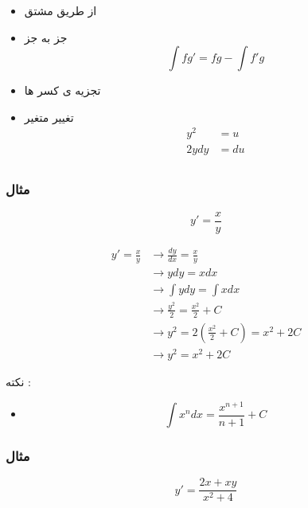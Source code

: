\documentclass[12pt]{book}
\begin{document}
\begin{tcolorbox}
\begin{itemize}
	\item از طریق مشتق
	\item جز به جز
	$$
	\int{fg'} = fg - \int{f'g}
	$$
	\item تجزیه ی کسر ها
	\item تغییر متغیر
	\begin{align*}
	y^{2} &= u \\
	2ydy &= du \\
	\end{align*}
\end{itemize}
\end{tcolorbox}

\subsubsection{مثال}

$$
y' = \frac{x}{y}
$$

\begin{align*}
y' = \frac{x}{y} &\to \frac{dy}{dx} = \frac{x}{y} \\
&\to ydy = xdx \\
&\to  \int{ydy} = \int{xdx} \\
&\to \frac{y^{2}}{2} = \frac{x^{2}}{2} + C \\
&\to y^{2} = 2 \left( \frac{x^{2}}{2} + C \right) = x^{2} + 2C \\
&\to y^{2} = x^{2} + 2C 
\end{align*}


\begin{tcolorbox}
نکته :
\begin{itemize}
	\item 
	$$
	\int {x^{n} dx} = \frac{x^{n+1}}{n+1} + C
	$$
\end{itemize}
\end{tcolorbox}


\subsubsection{مثال}

$$
y' = \frac{2x+xy}{x^{2}+4}
$$
\end{document}
